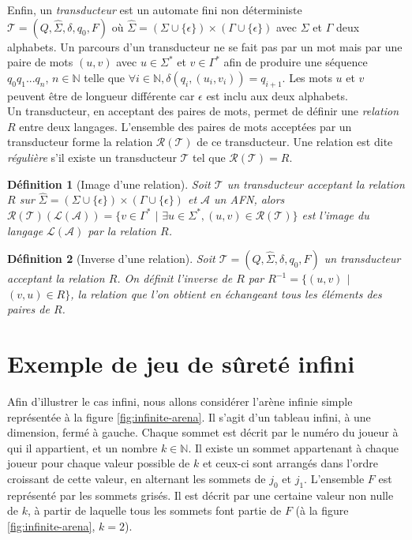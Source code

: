 \documentclass[12pt,a4paper,oneside,titlepage]{report}
\newtheorem{defi}{D\'efinition}[section]
\begin{document}
\noindent Enfin, un \emph{transducteur} est un automate fini non déterministe $\mathcal{T}=(Q,\hat{\Sigma},\delta,q_0,F)$ où $\hat{\Sigma}=(\Sigma\cup\{\epsilon\})\times(\Gamma\cup\{\epsilon\})$ avec $\Sigma$ et $\Gamma$ deux alphabets. Un parcours d'un transducteur ne se fait pas par un mot mais par une paire de mots $(u,v)$ avec $u\in\Sigma^*$ et $v\in\Gamma^*$ afin de produire une séquence $q_0q_1...q_n$, $n\in\mathbb{N}$ telle que $\forall i\in\mathbb{N}, \delta(q_i,(u_i,v_i))=q_{i+1}$. Les mots $u$ et $v$ peuvent être de longueur différente car $\epsilon$ est inclu aux deux alphabets.\\
Un transducteur, en acceptant des paires de mots, permet de définir une \emph{relation} $R$ entre deux langages. L'ensemble des paires de mots acceptées par un transducteur forme la relation $\mathcal{R}(\mathcal{T})$ de ce transducteur. Une relation est dite \emph{régulière} s'il existe un transducteur $\mathcal{T}$ tel que $\mathcal{R}(\mathcal{T})=R$.
\begin{defi}[Image d'une relation]
Soit $\mathcal{T}$ un transducteur acceptant la relation $R$ sur $\hat{\Sigma}=(\Sigma\cup\{\epsilon\})\times(\Gamma\cup\{\epsilon\})$ et $\mathcal{A}$ un AFN, alors\\ $\mathcal{R}(\mathcal{T})(\mathcal{L}(\mathcal{A}))=\{v\in\Gamma^*$ $|$ $\exists u\in\Sigma^*, (u,v)\in\mathcal{R}(\mathcal{T})\}$ est l'image du langage $\mathcal{L}(\mathcal{A})$ par la relation $R$.
\end{defi}
\begin{defi}[Inverse d'une relation]
Soit $\mathcal{T}=(Q,\hat{\Sigma},\delta,q_0,F)$ un transducteur acceptant la relation $R$. On définit l'inverse de $R$ par $R^{-1}=\{(u,v)$ $|$ $(v,u)\in R\}$, la relation que l'on obtient en échangeant tous les éléments des paires de $R$.
\end{defi}

\section{Exemple de jeu de sûreté infini}
Afin d'illustrer le cas infini, nous allons considérer l'arène infinie simple représentée à la figure \ref{fig:infinite-arena}. Il s'agit d'un tableau infini, à une dimension, fermé à gauche. Chaque sommet est décrit par le numéro du joueur à qui il appartient, et un nombre $k\in\mathbb{N}$. Il existe un sommet appartenant à chaque joueur pour chaque valeur possible de $k$ et ceux-ci sont arrangés dans l'ordre croissant de cette valeur, en alternant les sommets de $j_0$ et $j_1$. L'ensemble $F$ est représenté par les sommets grisés. Il est décrit par une certaine valeur non nulle de $k$, à partir de laquelle tous les sommets font partie de $F$ (à la figure \ref{fig:infinite-arena}, $k=2$).
\end{document}
